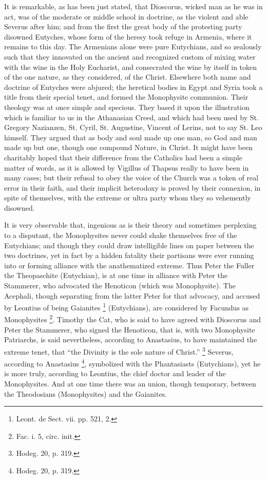 It is remarkable, as has been just stated, that Dioscorus, wicked
man as he was in act, was of the moderate or middle school in
doctrine, as the violent and able Severus after him; and from the
first the great body of the protesting party disowned Eutyches, whose
form of the heresy took refuge in Armenia, where it remains to this
day. The Armenians alone were pure Eutychians, and so zealously such
that they innovated on the ancient and recognized custom of mixing
water with the wine in the Holy Eucharist, and consecrated the wine by
itself in token of the one nature, as they considered, of the Christ.
Elsewhere both name and doctrine of Eutyches were abjured; the
heretical bodies in Egypt and Syria took a title from their special
tenet, and formed the Monophysite communion. Their theology was at
once simple and specious. They based it upon the illustration which is
familiar to us in the Athanasian Creed, and which had been used by St.
Gregory Nazianzen, St. Cyril, St. Augustine, Vincent of Lerins, not to
say St. Leo himself. They argued that as body and soul made up one
man, so God and man made up but one, though one compound Nature, in
Christ. It might have been charitably hoped that their difference from
the Catholics had been a simple matter of words, as it is allowed by
Vigillus of Thapsus really to have been in many cases; but their
refusal to obey the voice of the Church was a token of real error in
their faith, and their implicit heterodoxy is proved by their
connexion, in spite of themselves, with the extreme or ultra party
whom they so vehemently disowned.

It is very observable that, ingenious as is their theory and
sometimes perplexing to a disputant, the Monophysites never could
shake themselves free of the Eutychians; and though they could draw
intelligible lines on paper between the two doctrines, yet in fact by
a hidden fatality their partisans were ever running into or forming
alliance with the anathematized extreme. Thus Peter the Fuller the
Theopaschite (Eutychian), is at one time in alliance with Peter the
Stammerer, who advocated the Henoticon (which was Monophysite). The
Acephali, though separating from the latter Peter for that advocacy,
and accused by Leontius of being Gaianites \footnote{Leont. de Sect. vii. pp. 521, 2.} (Eutychians), are considered by Facundus as Monophysites \footnote{Fac. i. 5, circ. init.}. Timothy the Cat, who is said to have agreed with Dioscorus
and Peter the Stammerer, who signed the Henoticon, that is, with two
Monophysite Patriarchs, is said nevertheless, according to Anastasius,
to have maintained the extreme tenet, that ``the Divinity is the
sole nature of Christ.'' \footnote{Hodeg. 20, p. 319.} Severus, according to Anastasius \footnote{Hodeg. 20, p. 319.}, symbolized with the Phantasiasts (Eutychians), yet he is
more truly, according to Leontius, the chief doctor and leader of the
Monophysites. And at one time there was an union, though temporary,
between the Theodosians (Monophysites) and the Gaianites.

